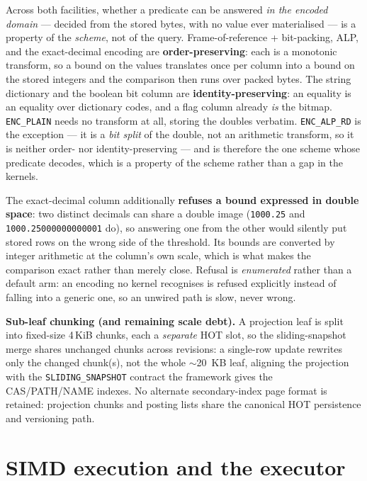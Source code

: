 \documentclass[11pt,a4paper,oneside]{report}
\theoremstyle{sirixthm}
\newcommand{\code}[1]{\texttt{#1}}
\begin{document}
\noindent Across both facilities, whether a predicate can be answered \emph{in the encoded domain}
--- decided from the stored bytes, with no value ever materialised --- is a property of the
\emph{scheme}, not of the query. Frame-of-reference {+} bit-packing, ALP, and the exact-decimal
encoding are \textbf{order-preserving}: each is a monotonic transform, so a bound on the values
translates once per column into a bound on the stored integers and the comparison then runs over
packed bytes. The string dictionary and the boolean bit column are \textbf{identity-preserving}: an
equality is an equality over dictionary codes, and a flag column already \emph{is} the bitmap.
\code{ENC\_PLAIN} needs no transform at all, storing the doubles verbatim. \code{ENC\_ALP\_RD} is the
exception --- it is a \emph{bit split} of the double, not an arithmetic transform, so it is neither
order- nor identity-preserving --- and is therefore the one scheme whose predicate decodes, which is
a property of the scheme rather than a gap in the kernels.

\noindent The exact-decimal column additionally \textbf{refuses a bound expressed in double space}:
two distinct decimals can share a double image (\code{1000.25} and \code{1000.25000000000001} do), so
answering one from the other would silently put stored rows on the wrong side of the threshold. Its
bounds are converted by integer arithmetic at the column's own scale, which is what makes the
comparison exact rather than merely close. Refusal is \emph{enumerated} rather than a default arm: an
encoding no kernel recognises is refused explicitly instead of falling into a generic one, so an
unwired path is slow, never wrong.

\begin{honesty}
\small\textbf{Sub-leaf chunking (and remaining scale debt).} A projection leaf is split into
fixed-size 4\,KiB chunks, each a \emph{separate} HOT slot, so the sliding-snapshot merge shares
unchanged chunks across revisions: a single-row update rewrites only the changed chunk(s), not
the whole $\sim$20~KB leaf, aligning the projection with the \code{SLIDING\_SNAPSHOT} contract the
framework gives the CAS/PATH/NAME indexes. No alternate secondary-index page format is retained:
projection chunks and posting lists share the canonical HOT persistence and versioning path.
\end{honesty}

\section{SIMD execution and the executor}
\end{document}
